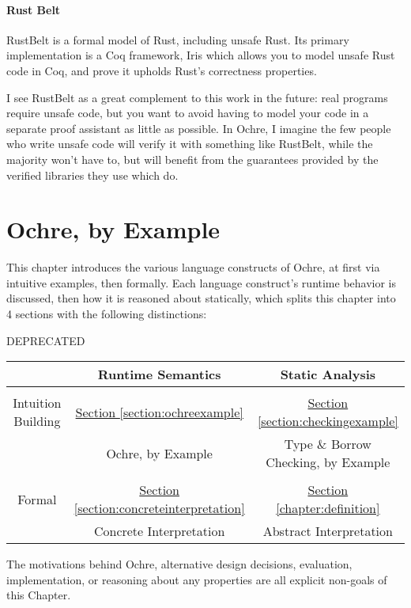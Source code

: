 \documentclass[12pt,twoside]{report}
\begin{document}
\subsubsection{Rust Belt}
RustBelt\citep{jung_rustbelt_2018} is a formal model of Rust, including unsafe Rust. Its primary implementation is a Coq framework, Iris\citep{noauthor_iris_nodate} which allows you to model unsafe Rust code in Coq, and prove it upholds Rust's correctness properties.

I see RustBelt as a great complement to this work in the future: real programs require unsafe code, but you want to avoid having to model your code in a separate proof assistant as little as possible. In Ochre, I imagine the few people who write unsafe code will verify it with something like RustBelt, while the majority won't have to, but will benefit from the guarantees provided by the verified libraries they use which do.

\chapter{Ochre, by Example}
\label{section:ochre}
This chapter introduces the various language constructs of Ochre, at first via intuitive examples, then formally. Each language construct's runtime behavior is discussed, then how it is reasoned about statically, which splits this chapter into 4 sections with the following distinctions:

DEPRECATED
\begin{center}
  \begin{tabular}{c|cc}
    & Runtime Semantics & Static Analysis \\
    \hline
    \\
    Intuition Building & \underline{Section \ref{section:ochreexample}} & \underline{Section \ref{section:checkingexample}} \\
    & Ochre, by Example & Type \& Borrow Checking, by Example \\
    \\
    Formal & \underline{Section \ref{section:concreteinterpretation}} & \underline{Section \ref{chapter:definition}} \\
    & Concrete Interpretation & Abstract Interpretation \\
  \end{tabular}
\end{center}

The motivations behind Ochre, alternative design decisions, evaluation, implementation, or reasoning about any properties are all explicit non-goals of this Chapter.
\end{document}
